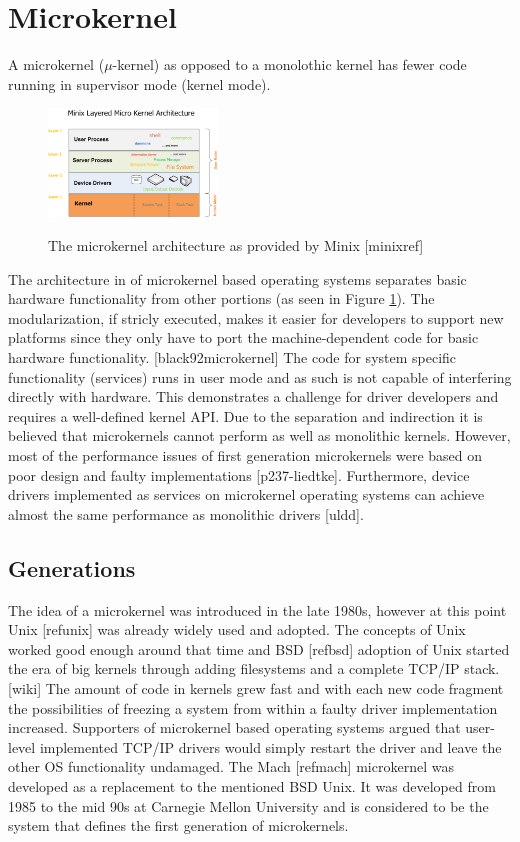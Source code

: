\documentclass{acm_proc_article-sp}
\begin{document}
\section{Microkernel}
A microkernel ($\mu$-kernel) as opposed to a monolothic kernel has fewer code running in
supervisor mode (kernel mode).
\begin{figure}
\centering
\includegraphics[width=0.4\textwidth]{minixinternalstructure.png}
\label{fig:minixmicarch}
\caption{The microkernel architecture as provided by Minix [minixref]}
\end{figure}
The architecture in of microkernel based operating systems separates basic
hardware functionality from other portions (as seen in Figure \ref{fig:minixmicarch}).
The modularization, if stricly executed, makes it easier for developers to support new
platforms since they only have to port the machine-dependent code for basic hardware functionality.
[black92microkernel]
The code for system specific functionality (services) runs in user mode and as such
is not capable of interfering directly with hardware.
This demonstrates a challenge for driver developers and requires a well-defined kernel API.
Due to the separation and indirection it is believed that microkernels cannot perform as well as
monolithic kernels.
However, most of the performance issues of first generation microkernels were based on poor design
and faulty implementations [p237-liedtke].
Furthermore, device drivers implemented as services on microkernel operating systems can achieve
almost the same performance as monolithic drivers [uldd].

\subsection{Generations}
The idea of a microkernel was introduced in the late 1980s, however at this point Unix [refunix]
was already widely used and adopted.
The concepts of Unix worked good enough around that time and BSD [refbsd] adoption of Unix started
the era of big kernels through adding filesystems and a complete TCP/IP stack. [wiki]
The amount of code in kernels grew fast and with each new code fragment the possibilities of
freezing a system from within a faulty driver implementation increased.
Supporters of microkernel based operating systems argued that user-level implemented TCP/IP drivers
would simply restart the driver and leave the other OS functionality undamaged.
The Mach [refmach] microkernel was developed as a replacement to the mentioned BSD Unix.
It was developed from 1985 to the mid 90s at Carnegie Mellon University and is considered to be
the system that defines the first generation of microkernels.
\end{document}
